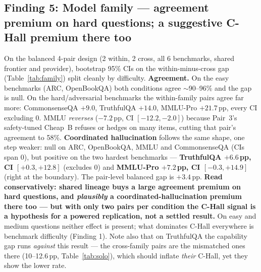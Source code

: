 \documentclass[conference]{IEEEtran}
\begin{document}
\subsection{Finding 5: Model family --- agreement premium on hard questions;
a suggestive C-Hall premium there too}
On the balanced 4-pair design (2 within, 2 cross, all 6 benchmarks, shared
frontier and provider), bootstrap 95\% CIs on the within-minus-cross gap
(Table~\ref{tab:family}) split cleanly by difficulty.
\textbf{Agreement.} On the easy benchmarks (ARC, OpenBookQA) both conditions
agree $\sim$90--96\% and the gap is null. On the hard/adversarial benchmarks the
within-family pairs agree far more: CommonsenseQA $+9.0$, TruthfulQA $+14.0$,
MMLU-Pro $+21.7$\,pp, every CI excluding 0. MMLU \textit{reverses}
($-7.2$\,pp, CI $[-12.2,-2.0]$) because Pair~3's safety-tuned Cheap~B refuses or
hedges on many items, cutting that pair's agreement to 58\%.
\textbf{Coordinated hallucination} follows the same shape, one step weaker: null
on ARC, OpenBookQA, MMLU and CommonsenseQA (CIs span 0), but positive on the two
hardest benchmarks --- \textbf{TruthfulQA $+6.6$\,pp, CI $[+0.3,+12.8]$}
(excludes 0) and \textbf{MMLU-Pro $+7.2$\,pp, CI $[-0.3,+14.9]$} (right at the
boundary). The pair-level balanced gap is $+3.4$\,pp.
\textbf{Read conservatively: shared lineage buys a large agreement premium on
hard questions, and \textit{plausibly} a coordinated-hallucination premium there
too --- but with only two pairs per condition the C-Hall signal is a hypothesis
for a powered replication, not a settled result.} On easy and medium questions
neither effect is present; what dominates C-Hall everywhere is benchmark
difficulty (Finding 1). Note also that on TruthfulQA the capability gap runs
\textit{against} this result --- the cross-family pairs are the mismatched ones
there (10--12.6\,pp, Table~\ref{tab:solo}), which should inflate \textit{their}
C-Hall, yet they show the lower rate.
\end{document}
